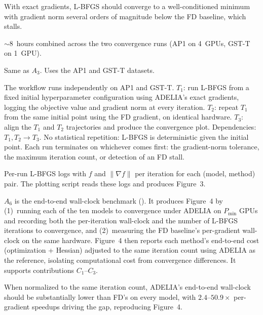 \documentclass[nonacm,sigconf]{acmart}
\begin{document}
\artexp

With exact gradients, L-BFGS should converge to a well-conditioned
minimum with gradient norm several orders of magnitude below the
FD baseline, which stalls.

\arttime

$\sim$8~hours combined across the two convergence runs
(AP1 on 4~GPUs, GST-T on 1~GPU).

\artin


Same as $A_3$. Uses the AP1 and GST-T datasets.

\artcomp

The workflow runs independently on AP1 and GST-T.
$T_1$: run L-BFGS from a fixed initial hyperparameter configuration
using ADELIA's exact gradients, logging the objective value
and gradient norm at every iteration.
$T_2$: repeat $T_1$ from the same initial point using the FD
gradient, on identical hardware.
$T_3$: align the $T_1$ and $T_2$ trajectories and produce the
convergence plot.
Dependencies: $T_1, T_2 \rightarrow T_3$. No statistical
repetition: L-BFGS is deterministic given the initial point.
Each run terminates on whichever comes first: the gradient-norm
tolerance, the maximum iteration count, or detection of an FD
stall.

\artout

Per-run L-BFGS logs with $f$ and $\|\nabla f\|$ per iteration
for each (model, method) pair. The plotting script
 reads these logs and
produces Figure~3.


\newartifact

\artrel

$A_6$ is the end-to-end wall-clock benchmark
(). It produces Figure~4 by
(1)~running each of the ten models to convergence under ADELIA
on $P_{\min}$ GPUs and recording both the per-iteration
wall-clock and the number of L-BFGS iterations to convergence,
and (2)~measuring the FD baseline's per-gradient wall-clock on
the same hardware. Figure~4 then reports each method's
end-to-end cost (optimization + Hessian) adjusted to the same
iteration count using ADELIA as the reference, isolating
computational cost from convergence differences. It supports
contributions $C_1$--$C_3$.

\artexp

When normalized to the same iteration count, ADELIA's
end-to-end wall-clock should be substantially lower than FD's
on every model, with $2.4$--$50.9\times$ per-gradient speedups
driving the gap, reproducing Figure~4.
\end{document}
